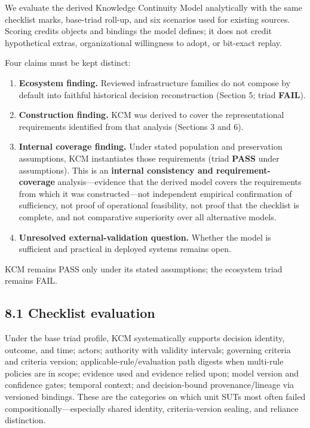 \documentclass[11pt,a4paper]{article}
\begin{document}
We evaluate the derived Knowledge Continuity Model analytically with the same checklist marks, base-triad roll-up, and six scenarios used for existing sources. Scoring credits objects and bindings the model defines; it does not credit hypothetical extras, organizational willingness to adopt, or bit-exact replay.


Four claims must be kept distinct:


\begin{enumerate}
\item \textbf{Ecosystem finding.} Reviewed infrastructure families do not compose by default into faithful historical decision reconstruction (Section 5; triad \textbf{FAIL}).
\item \textbf{Construction finding.} KCM was derived to cover the representational requirements identified from that analysis (Sections 3 and 6).
\item \textbf{Internal coverage finding.} Under stated population and preservation assumptions, KCM instantiates those requirements (triad \textbf{PASS} under assumptions). This is an \textbf{internal consistency and requirement-coverage} analysis---evidence that the derived model covers the requirements from which it was constructed---not independent empirical confirmation of sufficiency, not proof of operational feasibility, not proof that the checklist is complete, and not comparative superiority over all alternative models.
\item \textbf{Unresolved external-validation question.} Whether the model is sufficient and practical in deployed systems remains open.
\end{enumerate}

KCM remains PASS only under its stated assumptions; the ecosystem triad remains FAIL.


\subsection{8.1 Checklist evaluation}

Under the base triad profile, KCM systematically supports decision identity, outcome, and time; actors; authority with validity intervals; governing criteria and criteria version; applicable-rule/evaluation path digests when multi-rule policies are in scope; evidence used and evidence relied upon; model version and confidence gates; temporal context; and decision-bound provenance/lineage via versioned bindings. These are the categories on which unit SUTs most often failed compositionally---especially shared identity, criteria-version sealing, and reliance distinction.
\end{document}
